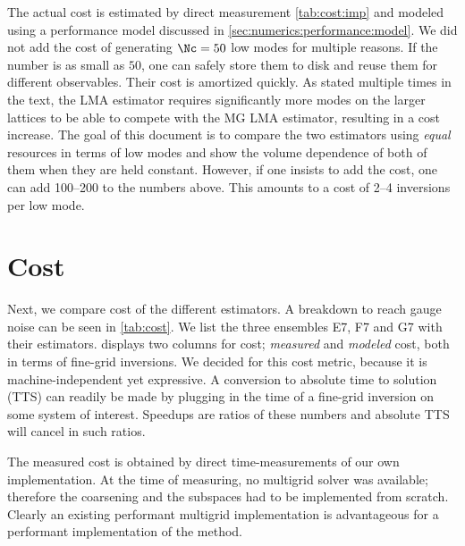 \begin{table}[b!]
\begin{threeparttable}
{The actual cost is estimated by direct measurement \cref{tab:cost:imp} and modeled using a performance model discussed in \cref{sec:numerics:performance:model}.
We did not add the cost of generating $\Nc=50$ low modes for multiple reasons. If the number is as small as $50$, one can safely store them to disk and reuse them for different observables.
Their cost is amortized quickly.
As stated multiple times in the text, the LMA estimator requires significantly more modes on the larger lattices to be able to compete with the MG LMA estimator, resulting in a cost increase.
The goal of this document is to compare the two estimators using \emph{equal} resources in terms of low modes and show the volume dependence of both of them when they are held constant.
However, if one insists to add the cost, one can add \numrange{100}{200} to the numbers above.
This amounts to a cost of \numrange{2}{4} inversions per low mode.
}
\end{threeparttable}
\end{table}

\section{Cost}
\label{sec:cost}

Next, we compare cost of the different estimators.
A breakdown to reach gauge noise can be seen in \cref{tab:cost}.
We list the three ensembles E7, F7 and G7 with their estimators.
 displays two columns for cost; \emph{measured} and \emph{modeled} cost, both in terms of fine-grid inversions.
We decided for this cost metric, because it is machine-independent yet expressive.
A conversion to absolute time to solution (TTS) can readily be made by plugging in the time of a fine-grid inversion on some system of interest.
Speedups are ratios of these numbers and absolute TTS will cancel in such ratios.

The measured cost is obtained by direct time-measurements of our own implementation.
At the time of measuring, no multigrid solver was available; therefore the coarsening and the subspaces had to be implemented from scratch.
Clearly an existing performant multigrid implementation is advantageous for a performant implementation of the method.

